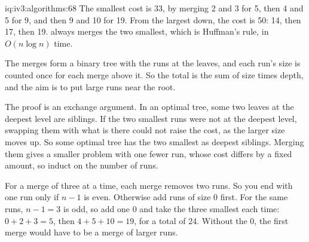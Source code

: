 \begin{solution}{iq:iv3:algorithms:68}
The smallest cost is 33, by merging 2 and 3 for 5, then 4 and 5 for 9, and then 9 and 10 for 19. From the largest down, the cost is 50: 14, then 17, then 19.  always merges the two smallest, which is Huffman's rule, in $O(n \log n)$ time.
\label{lst:iv3:al:mergeruns}

The merges form a binary tree with the runs at the leaves, and each run's size is counted once for each merge above it. So the total is the sum of size times depth, and the aim is to put large runs near the root.

The proof is an exchange argument. In an optimal tree, some two leaves at the deepest level are siblings. If the two smallest runs were not at the deepest level, swapping them with what is there could not raise the cost, as the larger size moves up. So some optimal tree has the two smallest as deepest siblings. Merging them gives a smaller problem with one fewer run, whose cost differs by a fixed amount, so induct on the number of runs.

For a merge of three at a time, each merge removes two runs. So you end with one run only if $n - 1$ is even. Otherwise add runs of size 0 first. For the same runs, $n - 1 = 3$ is odd, so add one 0 and take the three smallest each time: $0 + 2 + 3 = 5$, then $4 + 5 + 10 = 19$, for a total of 24. Without the 0, the first merge would have to be a merge of larger runs.

\end{solution}

